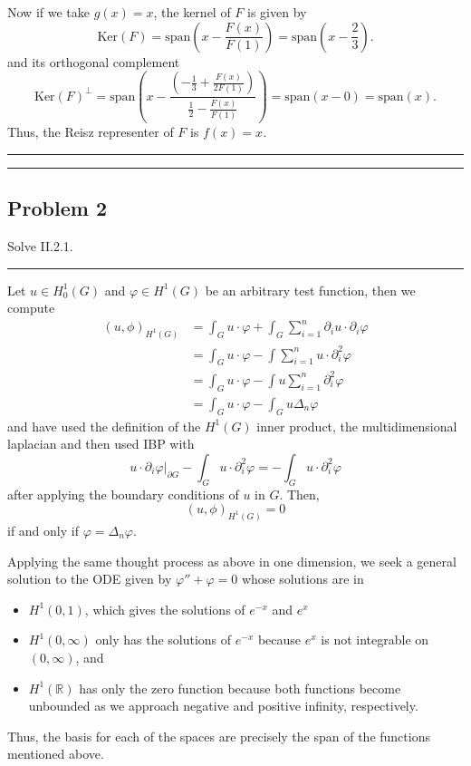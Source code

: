 \documentclass[12pt]{amsart}
\newcommand{\R}{\mathbb{R}}
\begin{document}
Now if we take $g(x) = x$, the kernel of $F$ is given by
\[ \text{Ker}(F) = \text{span}\left(x - \frac{F(x)}{F(1)}\right) = \text{span}\left( x - \frac{2}{3} \right).\]
and its orthogonal complement 
\[ \text{Ker}(F)^\perp = \text{span}\left(x -  \frac{\left( -\frac{1}{3} +\frac{F(x)}{2F(1)}\right)}{\frac{1}{2} - \frac{F(x)}{F(1)}}\right) = \text{span}\left( x - 0 \right) = \text{span}(x).\]
Thus, the Reisz representer of $F$ is $f(x) = x$. 

\medskip \hrule \hrule \medskip


\subsection*{Problem 2}
Solve II.2.1. \\
\medskip \hrule \medskip

 Let  $u \in H^1_0(G)$ and $\varphi \in H^1(G)$ be an arbitrary test function, then we compute
%
\begin{align*}
    (u, \phi)_{H^1(G)} &= \int_G u \cdot \varphi + \int_G \sum_{i = 1}^n \partial_i u \cdot \partial_i \varphi \\
    &= \int_G u \cdot \varphi - \int \sum_{i=1}^n u \cdot \partial^2_i \varphi \\
    &= \int_G u \cdot \varphi - \int u \sum_{i=1}^n \partial^2_i \varphi \\
    &= \int_G u \cdot \varphi - \int_G u \Delta_n \varphi
\end{align*}
and have used the definition of the $H^1(G)$ inner product, the multidimensional laplacian and then used IBP with 
	\[ u \cdot \partial_i \varphi \bigg\rvert_{\partial G} - \int_G u\cdot \partial_i^2 \varphi = - \int_G u\cdot \partial_i^2 \varphi\]
after applying the boundary conditions of $u$ in $G$. Then, 
	\[ (u, \phi)_{H^1(G)} = 0\]
if and only if $\varphi = \Delta_n \varphi $.

Applying the same thought process as above in one dimension, we seek a general solution to the ODE given by $\varphi'' + \varphi = 0$ whose solutions are in 
	\begin{itemize}
		\item $ H^1(0,1) $, which gives the solutions of $e^{-x}$ and $e^x$
		\item $H^1(0,\infty)$ only has the solutions of $e^{-x}$ because $e^x$ is not integrable on $(0, \infty)$, and
		\item $H^1(\R)$ has only the zero function because both functions become unbounded as we approach negative and positive infinity, respectively. 
	\end{itemize}
Thus, the basis for each of the spaces are precisely the span of the functions mentioned above.
\end{document}

